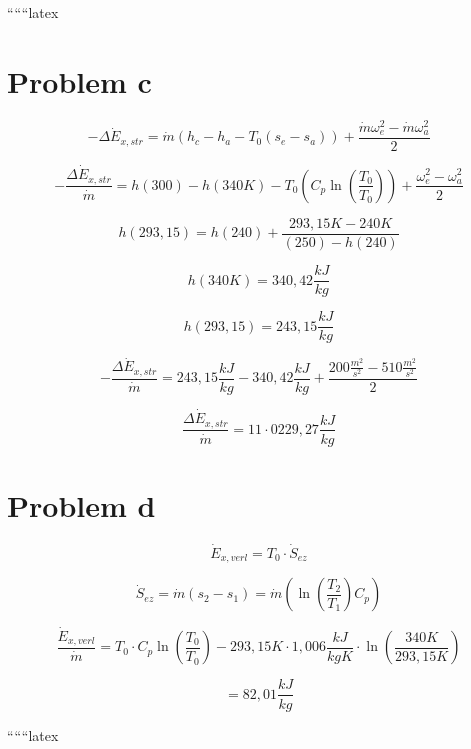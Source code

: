 ``````latex


\section*{Problem c}

\begin{equation*}
- \Delta \dot{E}_{x,str} = \dot{m} (h_c - h_a - T_0 (s_e - s_a)) + \frac{\dot{m} \omega_e^2 - \dot{m} \omega_a^2}{2}
\end{equation*}

\begin{equation*}
- \frac{\Delta \dot{E}_{x,str}}{\dot{m}} = h(300) - h(340K) - T_0 \left( C_p \ln \left( \frac{T_0}{T_0} \right) \right) + \frac{\omega_e^2 - \omega_a^2}{2}
\end{equation*}

\begin{equation*}
h(293,15) = h(240) + \frac{293,15K - 240K}{(250) - h(240)}
\end{equation*}

\begin{equation*}
h(340K) = 340,42 \frac{kJ}{kg}
\end{equation*}

\begin{equation*}
h(293,15) = 243,15 \frac{kJ}{kg}
\end{equation*}

\begin{equation*}
- \frac{\Delta \dot{E}_{x,str}}{\dot{m}} = 243,15 \frac{kJ}{kg} - 340,42 \frac{kJ}{kg} + \frac{200 \frac{m^2}{s^2} - 510 \frac{m^2}{s^2}}{2}
\end{equation*}

\begin{equation*}
\frac{\Delta \dot{E}_{x,str}}{\dot{m}} = 11 \cdot 0229,27 \frac{kJ}{kg}
\end{equation*}

\section*{Problem d}

\begin{equation*}
\dot{E}_{x,verl} = T_0 \cdot \dot{S}_{ez}
\end{equation*}

\begin{equation*}
\dot{S}_{ez} = \dot{m} (s_2 - s_1) = \dot{m} \left( \ln \left( \frac{T_2}{T_1} \right) C_p \right)
\end{equation*}

\begin{equation*}
\frac{\dot{E}_{x,verl}}{\dot{m}} = T_0 \cdot C_p \ln \left( \frac{T_0}{T_0} \right) - 293,15K \cdot 1,006 \frac{kJ}{kgK} \cdot \ln \left( \frac{340K}{293,15K} \right)
\end{equation*}

\begin{equation*}
= 82,01 \frac{kJ}{kg}
\end{equation*}

``````latex


